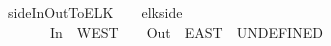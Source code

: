 \ sideInOutToELK\ {\isacharcolon}{\isacharcolon}\ {\isachardoublequoteopen}\ {\isasymRightarrow}\ elk{\isacharunderscore}side{\isachardoublequoteclose}\isanewline
\ \ \ {\isachardoublequoteopen}\ \ {\isacharequal}\isanewline
\ \ \ \ {\isacharparenleft}\ \ {\isacharequal}\ In\ \ WEST\ \ \ {\isacharequal}\ Out\ \ EAST\ \ UNDEFINED{\isacharparenright}{\isachardoublequoteclose}
